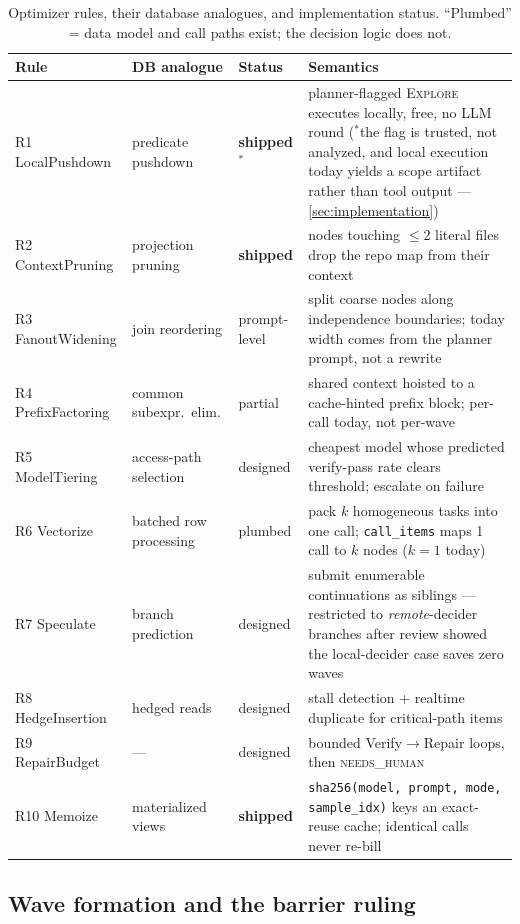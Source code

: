 \documentclass[11pt]{article}
\begin{document}
\begin{table}[!htbp]
\centering\small
\caption{Optimizer rules, their database analogues, and implementation status. ``Plumbed'' = data model and call paths exist; the decision logic does not.}
\label{tab:rules}
\begin{tabular}{@{}lllp{5.6cm}@{}}
\toprule
Rule & DB analogue & Status & Semantics \\
\midrule
R1 LocalPushdown & predicate pushdown & \textbf{shipped}$^{*}$ & planner-flagged \textsc{Explore} executes locally, free, no LLM round ($^{*}$the flag is trusted, not analyzed, and local execution today yields a scope artifact rather than tool output --- \cref{sec:implementation}) \\
R2 ContextPruning & projection pruning & \textbf{shipped} & nodes touching $\le$2 literal files drop the repo map from their context \\
R3 FanoutWidening & join reordering & prompt-level & split coarse nodes along independence boundaries; today width comes from the planner prompt, not a rewrite \\
R4 PrefixFactoring & common subexpr.\ elim. & partial & shared context hoisted to a cache-hinted prefix block; per-call today, not per-wave \\
R5 ModelTiering & access-path selection & designed & cheapest model whose predicted verify-pass rate clears threshold; escalate on failure \\
R6 Vectorize & batched row processing & plumbed & pack $k$ homogeneous tasks into one call; \texttt{call\_items} maps 1 call to $k$ nodes ($k{=}1$ today) \\
R7 Speculate & branch prediction & designed & submit enumerable continuations as siblings --- restricted to \emph{remote}-decider branches after review showed the local-decider case saves zero waves \\
R8 HedgeInsertion & hedged reads & designed & stall detection + realtime duplicate for critical-path items \\
R9 RepairBudget & --- & designed & bounded Verify$\to$Repair loops, then \textsc{needs\_human} \\
R10 Memoize & materialized views & \textbf{shipped} & \texttt{sha256(model, prompt, mode, sample\_idx)} keys an exact-reuse cache; identical calls never re-bill \\
\bottomrule
\end{tabular}
\end{table}

\subsection{Wave formation and the barrier ruling}
\end{document}
